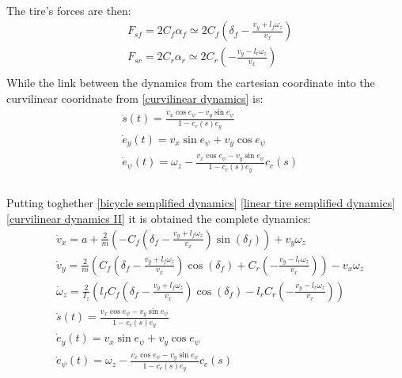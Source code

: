 \documentclass[12pt]{article}
\begin{document}
    \\
    The tire's forces are then:
    \begin{equation}
        \label{linear tire semplified dynamics}
        \begin{aligned}
            & F_{sf} = 2 C_f \alpha_f \simeq 2 C_f \left(\delta_f - \frac{v_y + l_f \omega_z}{v_x} \right)  \\
            & F_{sr} = 2 C_r \alpha_r \simeq 2 C_r \left(- \frac{v_y - l_r \omega_z}{v_x}\right)  \\
        \end{aligned}
    \end{equation}
    While the link between the dynamics from the cartesian coordinate into the
    curvilinear cooridnate from \ref{curvilinear dynamics} is:
    \begin{equation}
        \label{curvilinear dynamics II}
        \begin{aligned}
            & \dot{s}(t) = \frac{v_x \cos{e_{\psi}} - v_y \sin{e_{\psi}}}{1 - c_c(s) e_y}   \\
            & \dot{e}_y(t) = v_x \sin{e_{\psi}} + v_y \cos{e_{\psi}}  \\
            & \dot{e}_{\psi}(t) = \omega_z - \frac{v_x \cos{e_{\psi}} - v_y \sin{e_{\psi}}}{1 - c_c(s) e_y} c_c(s)  \\
        \end{aligned}
    \end{equation}
    \\
    Putting toghether \ref{bicycle semplified dynamics} \ref{linear tire semplified dynamics} \ref{curvilinear dynamics II}
    it is obtained the complete dynamics:
    \begin{equation}
        \begin{aligned}
            & \dot{v}_x = a + \frac{2}{m} \left(- C_f \left(\delta_f - \frac{v_y + l_f \omega_z}{v_x}\right) \sin(\delta_f)\right)  + v_y \omega_z   \\
            & \dot{v}_y = \frac{2}{m} \left(C_f \left(\delta_f - \frac{v_y + l_f \omega_z}{v_x}\right) \cos(\delta_f) + C_r \left(- \frac{v_y - l_r \omega_z}{v_x}\right)\right)  - v_x \omega_z   \\
            & \dot{\omega}_z = \frac{2}{I_z} \left(l_f C_f \left(\delta_f - \frac{v_y + l_f \omega_z}{v_x}\right) \cos(\delta_f) - l_r C_r \left(- \frac{v_y - l_r \omega_z}{v_x}\right)\right)  \\
            & \dot{s}(t) = \frac{v_x \cos{e_{\psi}} - v_y \sin{e_{\psi}}}{1 - c_c(s) e_y}   \\
            & \dot{e}_y(t) = v_x \sin{e_{\psi}} + v_y \cos{e_{\psi}}  \\
            & \dot{e}_{\psi}(t) = \omega_z - \frac{v_x \cos{e_{\psi}} - v_y \sin{e_{\psi}}}{1 - c_c(s) e_y} c_c(s)  \\
        \end{aligned}
    \end{equation}
\end{document}
